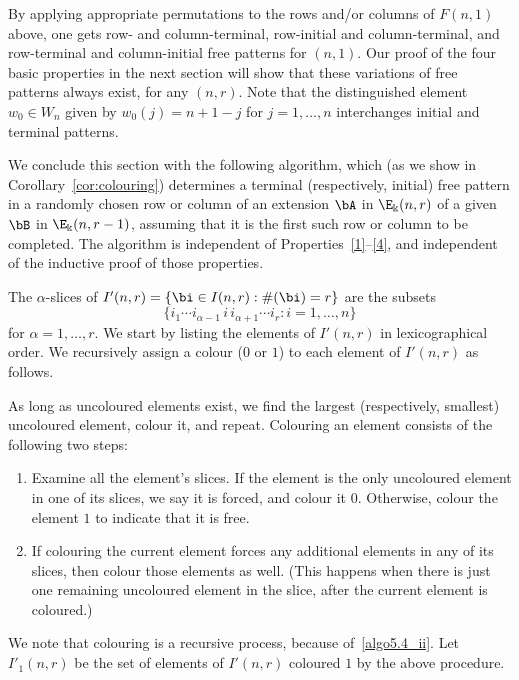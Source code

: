 By applying appropriate permutations to the rows and/or columns of
$F(n,1)$ above, one gets row- and column-terminal, row-initial and
column-terminal, and row-terminal and column-initial free patterns for
$(n,1)$. Our proof of the four basic properties in the next section
will show that these variations of free patterns always exist, for any
$(n,r)$. Note that the distinguished element $w_0 \in W_n$ given by
$w_0(j) = n+1-j$ for $j = 1, \dots, n$ interchanges initial and
terminal patterns.


We conclude this section with the following algorithm, which (as we
show in Corollary~\ref{cor:colouring}) determines a terminal
(respectively, initial) free pattern in a randomly chosen row or
column of an extension $\bA$ in $\E_\Bbbk(n,r)$ of a given $\bB$ in
$\E_\Bbbk(n,r-1)$, assuming that it is the first such row or column to
be completed. The algorithm is independent of
Properties~\ref{1}--\ref{4}, and independent of the inductive proof of
those properties.

\begin{algorithm}\label{algo}
The $\alpha$-slices of $I'(n,r)=\{\bi \in I(n,r): \#(\bi)=r\}$ are the
subsets
\[
\{i_1 \cdots i_{\alpha-1}\, i\, i_{\alpha+1}\cdots i_r: i = 1, \dots,
n\}
\]
for $\alpha = 1, \dots, r$. We start by listing the elements of
$I'(n,r)$ in lexicographical order. We recursively assign a colour
\textup{(}$0$ or $1$\textup{)} to each element of $I'(n,r)$ as follows.

As long as uncoloured elements exist, we find the largest
\textup{(}respectively, smallest\textup{)} uncoloured element, colour
it, and repeat. Colouring an element consists of the following two
steps:
\begin{enumerate}[label=(\alph*)]
\item\label{algo5.4_i} Examine all the element's slices. If the element is the only
 uncoloured element in one of its slices, we say it is forced, and
 colour it $0$. Otherwise, colour the element $1$ to indicate that it
 is free.
\item\label{algo5.4_ii} If colouring the current element forces any additional elements
 in any of its slices, then colour those elements as
 well. \textup{(}This happens when there is just one remaining
 uncoloured element in the slice, after the current element is
 coloured.\textup{)}
\end{enumerate}
We note that colouring is a recursive process, because of~\ref{algo5.4_ii}. Let $I'_1(n,r)$ be the set of elements of $I'(n,r)$
coloured $1$ by the above procedure.
\end{algorithm}

